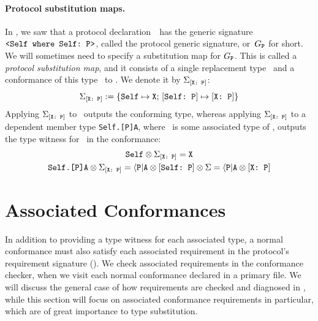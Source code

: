 \documentclass[../generics]{subfiles}
\begin{document}
\paragraph{Protocol substitution maps.}
In , we saw that a protocol declaration~\tP\ has the generic signature $\verb|<Self where Self: P>|$, called the protocol generic signature, or~$G_{\texttt{P}}$ for short. We will sometimes need to specify a substitution map for $G_{\texttt{P}}$. This is called a \emph{protocol substitution map}, and it consists of a single replacement type \tX\, and a conformance of this type \tX\ to \tP. We denote it by $\Sigma_{[\texttt{X:~P}]}$:
\[\Sigma_{[\texttt{X:~P}]} := \{
\texttt{Self} \mapsto \texttt{X}
;\,
[\texttt{Self:~P}] \mapsto [\texttt{X:~P}]
\}\]
Applying $\Sigma_{[\texttt{X:~P}]}$ to \IndexSelf\tSelf\ outputs the conforming type, whereas applying $\Sigma_{[\texttt{X:~P}]}$ to a dependent member type \texttt{Self.[P]A}, where \nA\ is some associated type of \tP, outputs the type witness for \nA\ in the conformance:
\begin{gather*}
\texttt{Self} \otimes \Sigma_{[\texttt{X:~P}]} = \texttt{X}\\
\texttt{Self.[P]A}\otimes\Sigma_{[\texttt{X:~P}]}=\langle\texttt{P}|\texttt{A}\otimes[\texttt{Self:~P}]\otimes\Sigma=\langle\texttt{P}|\texttt{A}\otimes[\texttt{X:~P}]
\end{gather*}

\section{Associated Conformances}\label{associated conformances}

In addition to providing a type witness for each associated type, a normal conformance must also satisfy each associated requirement in the protocol's requirement signature (). We check associated requirements in the conformance checker, when we visit each normal conformance declared in a primary file. We will discuss the general case of how requirements are checked and diagnosed in , while this section will focus on associated conformance requirements in particular, which are of great importance to type substitution.
\end{document}

